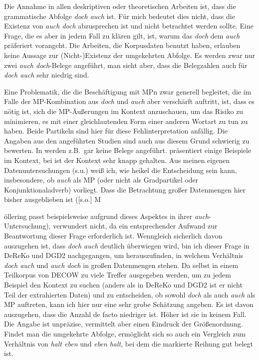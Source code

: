 Die Annahme in allen deskriptiven oder theoretischen Arbeiten ist, dass die grammatische Abfolge \textit{doch auch} ist. Für mich bedeutet dies nicht, dass die Exis\-tenz von \textit{auch doch} abzusprechen ist und nicht betrachtet werden sollte. Eine Frage, die es aber in jedem Fall zu klären gilt, ist, warum das \textit{doch} dem \textit{auch} präferiert vorangeht. Die Arbeiten, die Korpusdaten benutzt haben, erlauben keine Aussage zur (Nicht-)Existenz der umgekehrten Abfolge. Es werden zwar nur zwei \textit{auch doch}-Belege angeführt, man sieht aber, dass die Belegzahlen auch für \textit{doch auch} sehr niedrig sind.

Eine Problematik, die die Beschäftigung mit MPn zwar generell begleitet, die im Falle der MP-Kombination aus \textit{doch} und \textit{auch} aber verschärft auftritt, ist, dass es nötig ist, sich die MP-Äußerungen im Kontext anzuschauen, um das Risiko zu minimieren, es mit einer gleichlautenden Form einer anderen Wortart zu tun zu haben. Beide Partikeln sind hier für diese Fehlinterpretation anfällig. Die Angaben aus den angeführten Studien sind auch aus diesem Grund schwierig zu bewerten. In \citet{Braber2010} werden z.B.\ gar keine Belege angeführt. \citet{Rudolph1983} präsentiert einige Beispiele im Kontext, bei \citet{Moellering2004} ist der Kontext sehr knapp gehalten. Aus meinen eigenen Datenuntersuchungen (s.u.) weiß ich, wie heikel die Entscheidung sein kann, insbesondere, ob \textit{auch} als MP (oder nicht als Gradpartikel  oder  Konjunktionaladverb) vorliegt. Dass die Betrachtung großer Datenmengen hier bisher ausgeblieben ist ([s.o.] M{öllering passt beispielsweise aufgrund dieses Aspektes in ihrer \textit{auch}-Untersuchung), verwundert nicht, da ein entsprechender Aufwand zur Beantwortung dieser Frage erforderlich ist. Wenngleich sicherlich davon auszugehen ist, dass \textit{doch auch} deutlich überwiegen wird, bin ich dieser Frage in DeReKo und DGD2 nachgegangen, um herauszufinden, in welchem Verhältnis \textit{doch auch} und \textit{auch doch} in großen Datenmengen stehen. Da selbst in einem Teilkorpus von DECOW zu viele Treffer ausgegeben werden, um zu jedem Beispiel den Kontext zu suchen (anders als in DeReKo und DGD2 ist er nicht Teil der extrahierten Daten) und zu entscheiden, ob sowohl \textit{doch} als auch \textit{auch} als MP auftreten, kann ich hier nur eine sehr grobe Schätzung angeben. Es ist davon auszugehen, dass die Anzahl de facto niedriger ist. Höher ist sie in keinem Fall. Die Angabe ist unpräzise, vermittelt aber einen Eindruck der Größenordnung. Findet man die umgekehrte Abfolge, ermöglicht sich so auch ein Vergleich zum Verhältnis von \textit{halt eben} und \textit{eben halt}, bei dem die markierte Reihung gut belegt ist.

}
